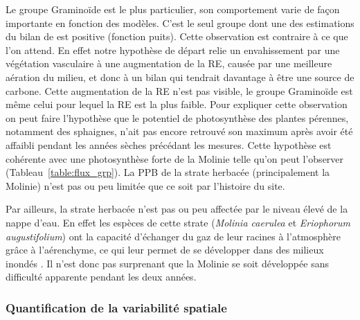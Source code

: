 Le groupe Graminoïde est le plus particulier, son comportement varie de façon importante en fonction des modèles.
C'est le seul groupe dont une des estimations du bilan de \coo est positive (fonction puits).
Cette observation est contraire à ce que l'on attend.
En effet notre hypothèse de départ relie un envahissement par une végétation vasculaire à une augmentation de la RE, causée par une meilleure aération du milieu, et donc à un bilan qui tendrait davantage à être une source de carbone.
Cette augmentation de la RE n'est pas visible, le groupe Graminoïde est même celui pour lequel la RE est la plus faible.
Pour expliquer cette observation on peut faire l'hypothèse que le potentiel de photosynthèse des plantes pérennes, notamment des sphaignes, n'ait pas encore retrouvé son maximum après avoir été affaibli pendant les années sèches précédant les mesures.
Cette hypothèse est cohérente avec une photosynthèse forte de la Molinie telle qu'on peut l'observer (Tableau~\ref{table:flux_grp}).
La PPB de la strate herbacée (principalement la Molinie) n'est pas ou peu limitée que ce soit par l'histoire du site.

Par ailleurs, la strate herbacée n'est pas ou peu affectée par le niveau élevé de la nappe d'eau.
En effet les espèces de cette strate (\textit{Molinia caerulea} et \textit{Eriophorum augustifolium}) ont la capacité d'échanger du gaz de leur racines à l'atmosphère grâce à l'aérenchyme, ce qui leur permet de se développer dans des milieux inondés \citep{taylor2001,rydin2013c}.
Il n'est donc pas surprenant que la Molinie se soit développée sans difficulté apparente pendant les deux années.

\subsubsection{Quantification de la variabilité spatiale}


